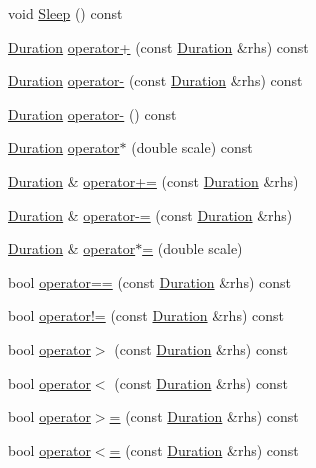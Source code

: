 \begin{DoxyCompactItemize}
\item 
void \hyperlink{classapollo_1_1cyber_1_1Duration_a240ddeaf69ee492e54c09518191c789b}{Sleep} () const 
\item 
\hyperlink{classapollo_1_1cyber_1_1Duration}{Duration} \hyperlink{classapollo_1_1cyber_1_1Duration_afd2507261eeedbfa387e28d3954709f1}{operator+} (const \hyperlink{classapollo_1_1cyber_1_1Duration}{Duration} \&rhs) const 
\item 
\hyperlink{classapollo_1_1cyber_1_1Duration}{Duration} \hyperlink{classapollo_1_1cyber_1_1Duration_a4a07adceef070a4c0d9225bd69ea5f8a}{operator-\/} (const \hyperlink{classapollo_1_1cyber_1_1Duration}{Duration} \&rhs) const 
\item 
\hyperlink{classapollo_1_1cyber_1_1Duration}{Duration} \hyperlink{classapollo_1_1cyber_1_1Duration_a9f0615f3c445ac6850b9c0f295dd9552}{operator-\/} () const 
\item 
\hyperlink{classapollo_1_1cyber_1_1Duration}{Duration} \hyperlink{classapollo_1_1cyber_1_1Duration_af7c1442e0950357809d9452df2674459}{operator$\ast$} (double scale) const 
\item 
\hyperlink{classapollo_1_1cyber_1_1Duration}{Duration} \& \hyperlink{classapollo_1_1cyber_1_1Duration_a32669135bc80a8211f81df67110da7c0}{operator+=} (const \hyperlink{classapollo_1_1cyber_1_1Duration}{Duration} \&rhs)
\item 
\hyperlink{classapollo_1_1cyber_1_1Duration}{Duration} \& \hyperlink{classapollo_1_1cyber_1_1Duration_aae3b5dacb40e0ef43ad955b6ee63c39a}{operator-\/=} (const \hyperlink{classapollo_1_1cyber_1_1Duration}{Duration} \&rhs)
\item 
\hyperlink{classapollo_1_1cyber_1_1Duration}{Duration} \& \hyperlink{classapollo_1_1cyber_1_1Duration_ae4058c0c81fecb76a2e33de5beddc337}{operator$\ast$=} (double scale)
\item 
bool \hyperlink{classapollo_1_1cyber_1_1Duration_a02d320ebe06cbce72bb554c228f57942}{operator==} (const \hyperlink{classapollo_1_1cyber_1_1Duration}{Duration} \&rhs) const 
\item 
bool \hyperlink{classapollo_1_1cyber_1_1Duration_a34d9a42e50f5ab65416f92f8b340b9da}{operator!=} (const \hyperlink{classapollo_1_1cyber_1_1Duration}{Duration} \&rhs) const 
\item 
bool \hyperlink{classapollo_1_1cyber_1_1Duration_ad57ff542c093f69d52d5fcd1e9bef3e9}{operator$>$} (const \hyperlink{classapollo_1_1cyber_1_1Duration}{Duration} \&rhs) const 
\item 
bool \hyperlink{classapollo_1_1cyber_1_1Duration_aafe6d4c78a88c7fc4cfd8969bc3d3dbc}{operator$<$} (const \hyperlink{classapollo_1_1cyber_1_1Duration}{Duration} \&rhs) const 
\item 
bool \hyperlink{classapollo_1_1cyber_1_1Duration_ab95228ad318e860cd242be863ba064d3}{operator$>$=} (const \hyperlink{classapollo_1_1cyber_1_1Duration}{Duration} \&rhs) const 
\item 
bool \hyperlink{classapollo_1_1cyber_1_1Duration_a2dcd98c7a530dac26f54539cd698473f}{operator$<$=} (const \hyperlink{classapollo_1_1cyber_1_1Duration}{Duration} \&rhs) const 
\end{DoxyCompactItemize}
